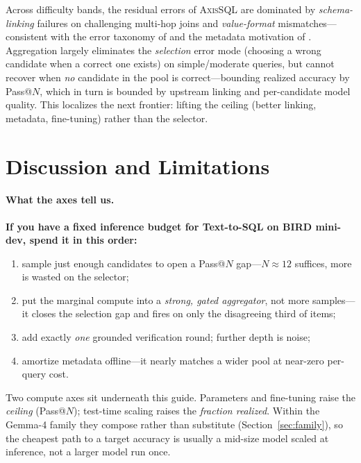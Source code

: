 \documentclass{article}
\newcommand{\sys}{\textsc{AxisSQL}\xspace}
\begin{document}
Across difficulty bands, the residual errors of \sys{} are dominated by \emph{schema-linking} failures on challenging multi-hop joins and \emph{value-format} mismatches---consistent with the error taxonomy of \citet{li2026deepeye} and the metadata motivation of \citet{shkapenyuk2025metadata}. Aggregation largely eliminates the \emph{selection} error mode (choosing a wrong candidate when a correct one exists) on simple/moderate queries, but cannot recover when \emph{no} candidate in the pool is correct---bounding realized accuracy by Pass@$N$, which in turn is bounded by upstream linking and per-candidate model quality. This localizes the next frontier: lifting the ceiling (better linking, metadata, fine-tuning) rather than the selector.

\section{Discussion and Limitations}
\label{sec:discussion}

\paragraph{What the axes tell us.} \textbf{If you have a fixed inference budget for Text-to-SQL on BIRD mini-dev, spend it in this order:}
\begin{enumerate}
\item sample just enough candidates to open a Pass@$N$ gap---$N\!\approx\!12$ suffices, more is wasted on the selector;
\item put the marginal compute into a \emph{strong, gated aggregator}, not more samples---it closes the selection gap and fires on only the disagreeing third of items;
\item add exactly \emph{one} grounded verification round; further depth is noise;
\item amortize metadata offline---it nearly matches a wider pool at near-zero per-query cost.
\end{enumerate}
Two compute axes sit underneath this guide. Parameters and fine-tuning raise the \emph{ceiling} (Pass@$N$); test-time scaling raises the \emph{fraction realized}. Within the Gemma-4 family they compose rather than substitute (Section~\ref{sec:family}), so the cheapest path to a target accuracy is usually a mid-size model scaled at inference, not a larger model run once.
\end{document}
